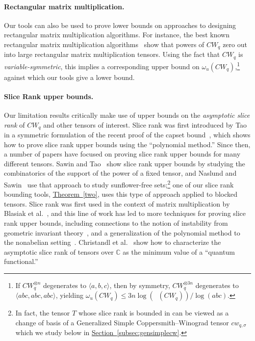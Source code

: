 \documentclass[11pt]{article}
\numberwithin{equation}{section}
\theoremstyle{definition}
\theoremstyle{plain}
\newcommand{\expref}[2]{\hyperref[#2]{#1~\ref{#2}}}
\newcommand{\trr}{\mathop{\tilde{\operatorname{R}}}}
\theoremstyle{definition}
\begin{document}
%
\paragraph{Rectangular matrix multiplication.} Our tools can also be used to prove lower bounds on approaches to designing rectangular matrix multiplication algorithms. For instance, the best known rectangular matrix multiplication algorithms~\cite{legallrect2} show that powers of $CW_q$ zero out into large rectangular matrix multiplication tensors. Using the fact that $CW_q$ is \emph{variable-symmetric}, this implies a corresponding upper bound on $\omega_u(CW_q)$,\footnote{If $CW_q^{\otimes n}$ degenerates to $\langle a,b,c \rangle$, then by symmetry, $CW_q^{\otimes 3n}$ degenerates to $\langle abc, abc, abc \rangle$, yielding $\omega_u(CW_q) \leq 3 n \log (\trr(CW_q)) / \log (abc)$.}
%
against which our tools give a lower bound.  %

%
\paragraph{Slice Rank upper bounds.} Our limitation results critically make use of upper bounds on the \emph{asymptotic slice rank} of $CW_q$ and other tensors of interest. Slice rank was first introduced by Tao~\cite{tao1} in a symmetric formulation of the recent proof of the capset bound~\cite{clp,eg}, which shows how to prove slice rank upper bounds using the ``polynomial method.'' Since then, a number of papers have focused on proving slice rank upper bounds for many different tensors. Sawin and Tao~\cite[Proposition~6]{tao2} show slice rank upper bounds by studying the combinatorics of the support of the power of a fixed tensor, and Naslund and Sawin~\cite{naslund2017upper} use that approach to study sunflower-free sets;\footnote{In fact, the tensor $T$ whose slice rank is bounded in \cite[Section~3]{naslund2017upper} can be viewed as a change of basis of a Generalized Simple Coppersmith--Winograd tensor $cw_{q,\sigma}$ which we study below in \expref{Section}{subsec:gensimplecw}.} one of our slice rank bounding tools, \expref{Theorem}{two}, uses this type of approach applied to blocked tensors. Slice rank was first used in the context of matrix multiplication by Blasiak et al.~\cite{blasiak}, and this line of work has led to more techniques for proving slice rank upper bounds, including connections to the notion of instability from geometric invariant theory~\cite{blasiak}, and a generalization of the polynomial method to the nonabelian setting~\cite{blasiak2017groups}. Christandl et al.~\cite{quantum} show how to characterize the asymptotic slice rank of tensors over $\mathbb{C}$ as the minimum value of a ``quantum functional.''
\end{document}
